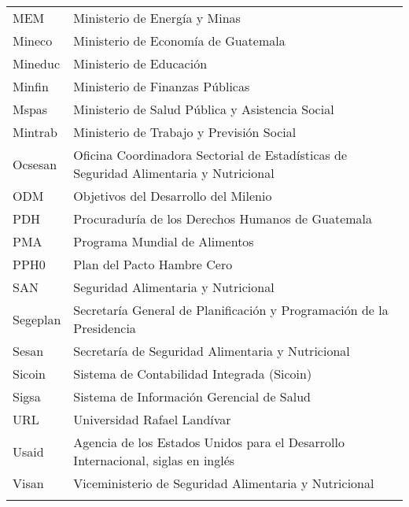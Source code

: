 \begin{center}
\begin{tabular}{p{4.3cm}l}
	MEM	&	Ministerio de Energía y Minas	\\
	\rowcolor{color1!5!white}Mineco	&	Ministerio de Economía de Guatemala	\\
	Mineduc	&	Ministerio de Educación	\\
	\rowcolor{color1!5!white}Minfin	&	Ministerio de Finanzas Públicas	\\
	Mspas	&	Ministerio de Salud Pública y Asistencia Social	\\
	\rowcolor{color1!5!white}Mintrab	&	Ministerio de Trabajo y Previsión Social	\\
	Ocsesan	&	Oficina Coordinadora Sectorial de Estadísticas de Seguridad Alimentaria y Nutricional	\\
	\rowcolor{color1!5!white} ODM	&	Objetivos del Desarrollo del Milenio	\\
	PDH	&	Procuraduría de los Derechos Humanos de Guatemala	\\
	\rowcolor{color1!5!white}PMA	&	Programa Mundial de Alimentos	\\
	PPH0	&	Plan del Pacto Hambre Cero	\\
	\rowcolor{color1!5!white}SAN	&	Seguridad Alimentaria y Nutricional	\\
	Segeplan	&	Secretaría General de Planificación y Programación de la Presidencia	\\
	\rowcolor{color1!5!white}Sesan	&	Secretaría de Seguridad Alimentaria y Nutricional	\\
	Sicoin	&	Sistema de Contabilidad Integrada (Sicoin)	\\
	\rowcolor{color1!5!white}Sigsa	&	Sistema de Información Gerencial de Salud	\\
	URL	&	Universidad Rafael Landívar	\\
	\rowcolor{color1!5!white}Usaid	&	Agencia de los Estados Unidos para el Desarrollo Internacional, siglas en inglés	\\
	Visan	&	Viceministerio de Seguridad Alimentaria y Nutricional	\\
		\hline
		&\\[-0.28cm]
	\end{tabular}
\end{center}
